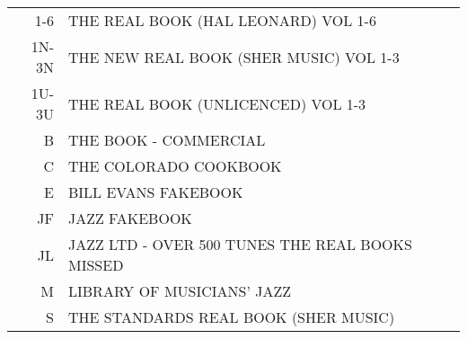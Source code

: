 \documentclass[8pt]{scrartcl}
\begin{document}
\selectfont
\begin{center}
  \begin{tabular}{r@{\quad=\quad}l}%
    1-6   & THE REAL BOOK (HAL LEONARD) VOL 1-6\\
    1N-3N & THE NEW REAL BOOK (SHER MUSIC) VOL 1-3\\
    1U-3U & THE REAL BOOK (UNLICENCED) VOL 1-3\\
    B     & THE BOOK - COMMERCIAL\\
    C     & THE COLORADO COOKBOOK\\
    E     & BILL EVANS FAKEBOOK\\
    JF    & JAZZ FAKEBOOK\\
    JL    & JAZZ LTD - OVER 500 TUNES THE REAL BOOKS MISSED\\
    M     & LIBRARY OF MUSICIANS’ JAZZ\\
    S     & THE STANDARDS REAL BOOK (SHER MUSIC)\\
  \end{tabular}
\end{center}

\begin{multicols}{3}
  \raggedright
  
\end{multicols}
\end{document}
